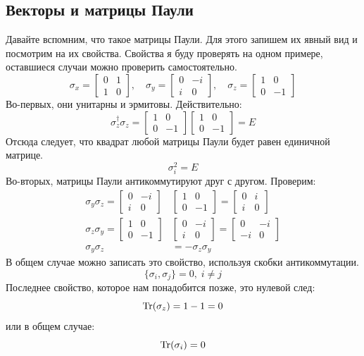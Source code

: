 \subsection{Векторы и матрицы Паули}
Давайте вспомним, что такое матрицы Паули. Для этого запишем их явный вид и посмотрим на их свойства. Свойства я буду проверять на одном примере, оставшиеся случаи можно проверить самостоятельно.
\[
\sigma_x = \begin{bmatrix} 0 & 1 \\ 1 & 0 \end{bmatrix}, \quad \sigma_y = \begin{bmatrix} 0 & -i \\ i & 0 \end{bmatrix}, \quad \sigma_z = \begin{bmatrix} 1 & 0 \\ 0 & -1 \end{bmatrix}
\]
Во-первых, они унитарны и эрмитовы. Действительно:
\[
\sigma_z^{\dagger}\sigma_z = \begin{bmatrix} 1 & 0 \\ 0 & -1 \end{bmatrix}\begin{bmatrix} 1 & 0 \\ 0 & -1 \end{bmatrix} = E
\]
Отсюда следует, что квадрат любой матрицы Паули будет равен единичной матрице.
\[
\sigma_i^2 = E
\]
Во-вторых, матрицы Паули антикоммутируют друг с другом. Проверим:
\begin{align*}
    \sigma_y\sigma_z = \begin{bmatrix} 0 & -i \\ i & 0 \end{bmatrix}&\begin{bmatrix} 1 & 0 \\ 0 & -1 \end{bmatrix} = \begin{bmatrix} 0 & i \\ i & 0 \end{bmatrix}\\
    \sigma_z\sigma_y = \begin{bmatrix} 1 & 0 \\ 0 & -1 \end{bmatrix}&\begin{bmatrix} 0 & -i \\ i & 0 \end{bmatrix} = \begin{bmatrix} 0 & -i \\ -i & 0 \end{bmatrix}\\
    \sigma_y\sigma_z &= -\sigma_z\sigma_y
\end{align*}
В общем случае можно записать это свойство, используя скобки антикоммутации.
\[
\{\sigma_i,\sigma_j\} = 0, \; i\neq j
\]
Последнее свойство, которое нам понадобится позже, это нулевой след:
\[
\Tr(\sigma_z) = 1 - 1 = 0
\]
или в общем случае:
\[
\Tr(\sigma_i) = 0
\]

